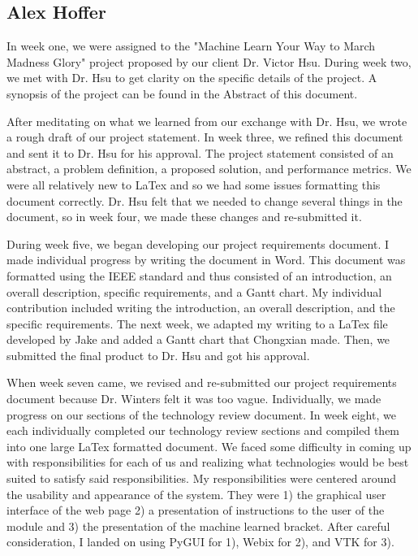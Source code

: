 \documentclass[letterpaper, 10pt,titlepage]{article}
\begin{document}
\subsection{Alex Hoffer}
\par In week one, we were assigned to the "Machine Learn Your Way to March Madness Glory" project proposed by our client Dr. Victor Hsu. During week two, we met with Dr. Hsu to get clarity on the specific details of the project. A synopsis of the project can be found in the Abstract of this document. 
\par After meditating on what we learned from our exchange with Dr. Hsu, we wrote a rough draft of our project statement. In week three, we refined this document and sent it to Dr. Hsu for his approval. The project statement consisted of an abstract, a problem definition, a proposed solution, and performance metrics. We were all relatively new to LaTex and so we had some issues formatting this document correctly. Dr. Hsu felt that we needed to change several things in the document, so in week four, we made these changes and re-submitted it.
\par During week five, we began developing our project requirements document. I made individual progress by writing the document in Word. This document was formatted using the IEEE standard and thus consisted of an introduction, an overall description, specific requirements, and a Gantt chart. My individual contribution included writing the introduction, an overall description, and the specific requirements. The next week, we adapted my writing to a LaTex file developed by Jake and added a Gantt chart that Chongxian made. Then, we submitted the final product to Dr. Hsu and got his approval. 
\par When week seven came, we revised and re-submitted our project requirements document because Dr. Winters felt it was too vague. Individually, we made progress on our sections of the technology review document. In week eight, we each individually completed our technology review sections and compiled them into one large LaTex formatted document. We faced some difficulty in coming up with responsibilities for each of us and realizing what technologies would be best suited to satisfy said responsibilities. My responsibilities were centered around the usability and appearance of the system. They were 1) the graphical user interface of the web page 2) a presentation of instructions to the user of the module and 3) the presentation of the machine learned bracket. After careful consideration, I landed on using PyGUI for 1), Webix for 2), and VTK for 3). 
\end{document}
